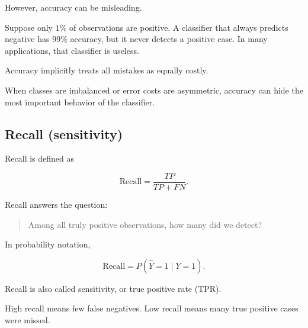 \documentclass[
  letterpaper,
  DIV=11,
  numbers=noendperiod]{scrreprt}
\theoremstyle{definition}
\theoremstyle{definition}
\theoremstyle{plain}
\theoremstyle{plain}
\theoremstyle{remark}
\begin{document}
However, accuracy can be misleading.

Suppose only \(1\%\) of observations are positive. A classifier that
always predicts negative has \(99\%\) accuracy, but it never detects a
positive case. In many applications, that classifier is useless.

\begin{tcolorbox}[enhanced jigsaw, arc=.35mm, bottomrule=.15mm, bottomtitle=1mm, breakable, colback=white, colbacktitle=quarto-callout-caution-color!10!white, colframe=quarto-callout-caution-color-frame, coltitle=black, left=2mm, leftrule=.75mm, opacityback=0, opacitybacktitle=0.6, rightrule=.15mm, title=\textcolor{quarto-callout-caution-color}{\faFire}\hspace{0.5em}{Accuracy is not enough}, titlerule=0mm, toprule=.15mm, toptitle=1mm]

Accuracy implicitly treats all mistakes as equally costly.

When classes are imbalanced or error costs are asymmetric, accuracy can
hide the most important behavior of the classifier.

\end{tcolorbox}

\subsection{Recall (sensitivity)}\label{recall-sensitivity}

Recall is defined as

\[
\text{Recall}
=
\frac{TP}{TP+FN}.
\]

Recall answers the question:

\begin{quote}
Among all truly positive observations, how many did we detect?
\end{quote}

In probability notation,

\[
\text{Recall}
=
P(\hat Y=1\mid Y=1).
\]

Recall is also called sensitivity, or true positive rate (TPR).

High recall means few false negatives. Low recall means many true
positive cases were missed.
\end{document}
